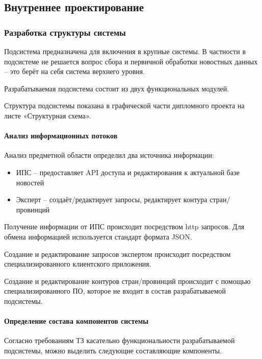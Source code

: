 \subsection{Внутреннее проектирование}
\subsubsection{Разработка структуры системы}

Подсистема предназначена для включения в крупные системы. В частности в подсистеме не решается вопрос сбора и первичной обработки новостных данных -- это берёт на себя система верхнего уровня.

Разрабатываемая подсистема состоит из двух функциональных модулей.

Структура подсистемы показана в графической части дипломного проекта на листе «Структурная схема».

\paragraph{Анализ информационных потоков} \hfill

Анализ предметной области определил два источника информации:

\begin{itemize}
\item ИПС -- предоставляет API доступа и редактирования к актуальной базе новостей
\item Эксперт -- создаёт/редактирует запросы, редактирует контура стран/провинций
\end{itemize}

Получение информации от ИПС происходит посредством http запросов. Для обмена информацией используется стандарт формата JSON.

Создание и редактирование запросов экспертом происходит посредством специализированного клиентского приложения.

Создание и редактирование контуров стран/провинций происходит с помощью специализированного ПО, которое не входит в состав разрабатываемой подсистемы.

\clearpage
\paragraph{Определение состава компонентов системы} \hfill

Согласно требованиям ТЗ касательно функциональности разрабатываемой подсистемы, можно выделить следующие составляющие компоненты.

